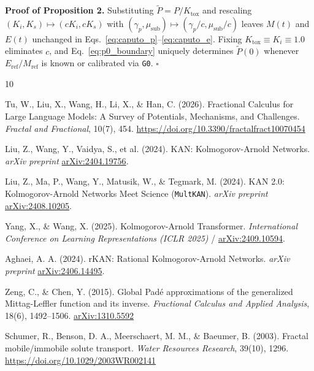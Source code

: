 \documentclass[10pt,twocolumn,a4paper]{article}
\begin{document}
\noindent\textbf{Proof of Proposition 2.} Substituting $\tilde{P} = P / K_{\text{tox}}$ and rescaling $(K_i, K_s) \mapsto (cK_i, cK_s)$ with $(\gamma_p, \mu_{\text{sub}}) \mapsto (\gamma_p/c, \mu_{\text{sub}}/c)$ leaves $M(t)$ and $E(t)$ unchanged in Eqs.~\eqref{eq:caputo_p}--\eqref{eq:caputo_e}. Fixing $K_{\text{tox}} \equiv K_i \equiv 1.0$ eliminates $c$, and Eq.~\eqref{eq:p0_boundary} uniquely determines $\tilde{P}(0)$ whenever $E_{\text{ref}}/M_{\text{ref}}$ is known or calibrated via \texttt{G0}. $\square$

\begin{thebibliography}{10}
\footnotesize
\setlength{\itemsep}{1.5pt}

Tu, W., Liu, X., Wang, H., Li, X., \& Han, C. (2026). Fractional Calculus for Large Language Models: A Survey of Potentials, Mechanisms, and Challenges. \textit{Fractal and Fractional}, 10(7), 454. \href{https://doi.org/10.3390/fractalfract10070454}{https://doi.org/10.3390/fractalfract10070454}

Liu, Z., Wang, Y., Vaidya, S., et al. (2024). KAN: Kolmogorov-Arnold Networks. \textit{arXiv preprint} \href{https://arxiv.org/abs/2404.19756}{arXiv:2404.19756}.

Liu, Z., Ma, P., Wang, Y., Matusik, W., \& Tegmark, M. (2024). KAN 2.0: Kolmogorov-Arnold Networks Meet Science (\texttt{MultKAN}). \textit{arXiv preprint} \href{https://arxiv.org/abs/2408.10205}{arXiv:2408.10205}.

Yang, X., \& Wang, X. (2025). Kolmogorov-Arnold Transformer. \textit{International Conference on Learning Representations (ICLR 2025)} / \href{https://arxiv.org/abs/2409.10594}{arXiv:2409.10594}.

Aghaei, A. A. (2024). rKAN: Rational Kolmogorov-Arnold Networks. \textit{arXiv preprint} \href{https://arxiv.org/abs/2406.14495}{arXiv:2406.14495}.

Zeng, C., \& Chen, Y. (2015). Global Pad\'e approximations of the generalized Mittag-Leffler function and its inverse. \textit{Fractional Calculus and Applied Analysis}, 18(6), 1492--1506. \href{https://arxiv.org/abs/1310.5592}{arXiv:1310.5592}

Schumer, R., Benson, D. A., Meerschaert, M. M., \& Baeumer, B. (2003). Fractal mobile/immobile solute transport. \textit{Water Resources Research}, 39(10), 1296. \href{https://doi.org/10.1029/2003WR002141}{https://doi.org/10.1029/2003WR002141}


\end{thebibliography}
\end{document}
